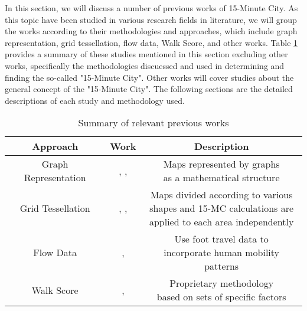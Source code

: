 In this section, we will discuss a number of previous works of 15-Minute City. As this topic have been studied in various research fields in literature, we will group the works according to their methodologies and approaches, which include graph representation, grid tessellation, flow data, Walk Score, and other works. Table \ref{tab:previous_works} provides a summary of these studies mentioned in this section excluding other works, specifically the methodologies discuessed and used in determining and finding the so-called "15-Minute City". Other works will cover studies about the general concept of the "15-Minute City". The following sections are the detailed descriptions of each study and methodology used.

\begin{table}[htbp]
    \begin{center}
        \caption{Summary of relevant previous works}
        \label{tab:previous_works}
        \begin{tabular}{ |c|c|c| }
            \hline
            \textbf{Approach} & \textbf{Work} & \textbf{Description} \\
            \hline
            \hline
            Graph Representation & \makecell{\cite{barbieri_graph_2023}, \cite{caselli_exploring_2022},\\\cite{rhoads_inclusive_2023}} & \makecell{Maps represented by graphs\\as a mathematical structure}\\
            \hline
            Grid Tessellation & \makecell{\cite{gaglione_urban_2022}, \cite{olivari_are_2023},\\\cite{Pezzica_Altafini_Mara_Chioni_2024}} & \makecell{Maps divided according to various\\shapes and 15-MC calculations are\\applied to each area independently} \\
            \hline
            Flow Data & \cite{zhang_towards_2023}, \cite{sarkar_measuring_2020} & \makecell{Use foot travel data to\\incorporate human mobility patterns} \\
            \hline
            Walk Score & \cite{walkscore}, \cite{weng_15-minute_2019} & \makecell{Proprietary methodology\\based on sets of specific factors} \\
            \hline
        \end{tabular}
    \end{center}
\end{table}

